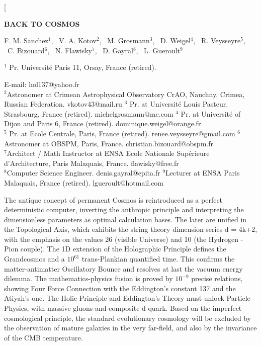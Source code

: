 \documentclass[twoside,draft]{article}
\begin{document}
\begin{sloppypar}

\renewcommand{\refname}{References}
\renewcommand{\tablename}{\small Table}
\renewcommand{\figurename}{\small Fig.}
\renewcommand{\contentsname}{Contents}


\twocolumn[%
\begin{center}
\renewcommand{\baselinestretch}{0.93}
{\Large\bfseries BACK TO COSMOS

}\par
\renewcommand{\baselinestretch}{1.0}
\bigskip
F. M. Sanchez$^1\!$, \ V. A. Kotov$^2\!$, \ M. Grosmann$^3$, \ D. Weigel$^4$, \ R. Veysseyre$^5$,\\ \ C. Bizouard$^6$, \ N. Flawisky$^7$, \ D. Gayral$^8$, \ L. Gueroult$^9$\\
{\footnotesize  $^1$ Pr. Universit\'{e} Paris 11, Orsay, France (retired).\rule{0pt}{12pt}
E-mail: hol137@yahoo.fr\\
$^2$Astronomer at Crimean Astrophysical Observatory CrAO, Nauchny, Crimea, Russian Federation. vkotov43@mail.ru
$^3$ Pr. at Universit\'{e} Louis Pasteur, Strasbourg, France (retired). michelgrosmann@me.com
$^4$ Pr. at Universit\'{e} of Dijon and Paris 6, France (retired). dominique.weigel@orange.fr
\\ $^5$ Pr. at Ecole Centrale, Paris, France (retired). renee.veysseyre@gmail.com
$^6$Astronomer at OBSPM, Paris, France. christian.bizouard@obspm.fr
\\ $^7$Architect / Math Instructor at ENSA Ecole Nationale Sup\'{e}rieure d'Architecture, Paris Malaquais, France. flawisky@free.fr
\\$^8$Computer Science Engineer. denis.gayral@epita.fr
$^9$Lecturer at ENSA Paris Malaquais, France (retired). lgueroult@hotmail.com

}\par
\medskip
{\small\parbox{11cm}{%


The antique concept of permanent Cosmos is reintroduced as a perfect deterministic computer, inverting the anthropic principle and interpreting the dimensionless parameters as optimal calculation bases. The later are unified in the Topological Axis, which exhibits the string theory dimension series d = 4k+2, with the emphasis on the values 26 (visible Universe) and 10 (the Hydrogen - Pion couple). The 1D extension of the Holographic Principle defines the Grandcosmos and a $10^{61}$ trans-Plankian quantified time. This confirms the matter-antimatter Oscillatory Bounce and resolves at last the vacuum energy dilemma. The mathematics-physics fusion is proved by $10^{-9}$ precise relations, showing Four Force Connection with the Eddington's constant 137 and the Atiyah's one. The Holic Principle and Eddington's Theory must unlock Particle Physics, with massive gluons and composite d quark. Based on the imperfect cosmological principle, the standard evolutionary cosmology will be excluded by the observation of mature galaxies in the very far-field, and also by the invariance of the CMB temperature.  

}}
\end{center}
\end{sloppypar}
\end{document}
